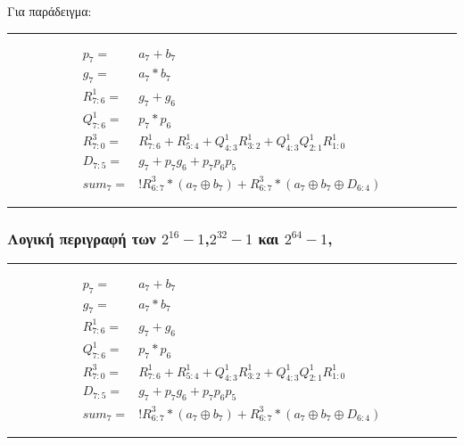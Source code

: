 Για παράδειγμα:\\
\rule{\linewidth}{0.5mm}
\begin{equation*}
\begin{split}
p_7 =& a_7 + b_7\\
g_7 =& a_7 * b_7\\
R^1_{7:6} =& g_7 + g_{6}\\
Q^1_{7:6} =& p_7 * p_{6}\\
R^3_{7:0} =& R^1_{7:6} + R^1_{5:4} + Q^1_{4:3} R^1_{3:2} + Q^1_{4:3} Q^1_{2:1} R^1_{1:0}\\
D_{7:5} =& g_7 + p_7g_{6} + p_7p_{6}p_{5}\\
sum_7 =& !R^3_{6:7} * (a_7 \oplus b_7) + R^3_{6:7} * (a_7 \oplus b_7 \oplus D_{6:4})
\end{split}
\end{equation*}
\rule{\linewidth}{0.5mm}











\subsubsection{Λογική περιγραφή των $2^{16}-1$,$2^{32}-1$ και $2^{64}-1$,}
\rule{\linewidth}{0.5mm}
\begin{equation*}
\begin{split}
p_7 =& a_7 + b_7\\
g_7 =& a_7 * b_7\\
R^1_{7:6} =& g_7 + g_{6}\\
Q^1_{7:6} =& p_7 * p_{6}\\
R^3_{7:0} =& R^1_{7:6} + R^1_{5:4} + Q^1_{4:3} R^1_{3:2} + Q^1_{4:3} Q^1_{2:1} R^1_{1:0}\\
D_{7:5} =& g_7 + p_7g_{6} + p_7p_{6}p_{5}\\
sum_7 =& !R^3_{6:7} * (a_7 \oplus b_7) + R^3_{6:7} * (a_7 \oplus b_7 \oplus D_{6:4})
\end{split}
\end{equation*}
\rule{\linewidth}{0.5mm}























